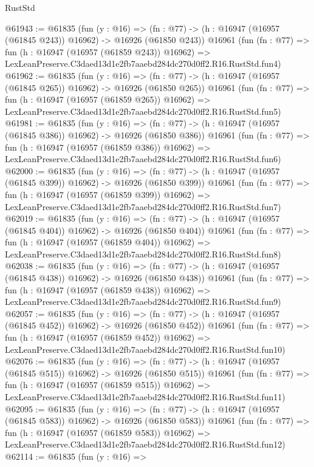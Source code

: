\begin{lexlean}{RustStd}
\begin{coremodule}
@61943 := @61835
    (fun (y : @16) =>
    (fn : @77) -> (h : @16947 (@16957 (@61845 @243)) @16962) -> @16926 (@61850 @243))
    @16961
    (fun (fn : @77) =>
    fun (h : @16947 (@16957 (@61859 @243)) @16962) =>
    LexLeanPreserve.C3daed13d1e2fb7aaebd284dc270d0ff2.R16.RustStd.fun4)
@61962 := @61835
    (fun (y : @16) =>
    (fn : @77) -> (h : @16947 (@16957 (@61845 @265)) @16962) -> @16926 (@61850 @265))
    @16961
    (fun (fn : @77) =>
    fun (h : @16947 (@16957 (@61859 @265)) @16962) =>
    LexLeanPreserve.C3daed13d1e2fb7aaebd284dc270d0ff2.R16.RustStd.fun5)
@61981 := @61835
    (fun (y : @16) =>
    (fn : @77) -> (h : @16947 (@16957 (@61845 @386)) @16962) -> @16926 (@61850 @386))
    @16961
    (fun (fn : @77) =>
    fun (h : @16947 (@16957 (@61859 @386)) @16962) =>
    LexLeanPreserve.C3daed13d1e2fb7aaebd284dc270d0ff2.R16.RustStd.fun6)
@62000 := @61835
    (fun (y : @16) =>
    (fn : @77) -> (h : @16947 (@16957 (@61845 @399)) @16962) -> @16926 (@61850 @399))
    @16961
    (fun (fn : @77) =>
    fun (h : @16947 (@16957 (@61859 @399)) @16962) =>
    LexLeanPreserve.C3daed13d1e2fb7aaebd284dc270d0ff2.R16.RustStd.fun7)
@62019 := @61835
    (fun (y : @16) =>
    (fn : @77) -> (h : @16947 (@16957 (@61845 @404)) @16962) -> @16926 (@61850 @404))
    @16961
    (fun (fn : @77) =>
    fun (h : @16947 (@16957 (@61859 @404)) @16962) =>
    LexLeanPreserve.C3daed13d1e2fb7aaebd284dc270d0ff2.R16.RustStd.fun8)
@62038 := @61835
    (fun (y : @16) =>
    (fn : @77) -> (h : @16947 (@16957 (@61845 @438)) @16962) -> @16926 (@61850 @438))
    @16961
    (fun (fn : @77) =>
    fun (h : @16947 (@16957 (@61859 @438)) @16962) =>
    LexLeanPreserve.C3daed13d1e2fb7aaebd284dc270d0ff2.R16.RustStd.fun9)
@62057 := @61835
    (fun (y : @16) =>
    (fn : @77) -> (h : @16947 (@16957 (@61845 @452)) @16962) -> @16926 (@61850 @452))
    @16961
    (fun (fn : @77) =>
    fun (h : @16947 (@16957 (@61859 @452)) @16962) =>
    LexLeanPreserve.C3daed13d1e2fb7aaebd284dc270d0ff2.R16.RustStd.fun10)
@62076 := @61835
    (fun (y : @16) =>
    (fn : @77) -> (h : @16947 (@16957 (@61845 @515)) @16962) -> @16926 (@61850 @515))
    @16961
    (fun (fn : @77) =>
    fun (h : @16947 (@16957 (@61859 @515)) @16962) =>
    LexLeanPreserve.C3daed13d1e2fb7aaebd284dc270d0ff2.R16.RustStd.fun11)
@62095 := @61835
    (fun (y : @16) =>
    (fn : @77) -> (h : @16947 (@16957 (@61845 @583)) @16962) -> @16926 (@61850 @583))
    @16961
    (fun (fn : @77) =>
    fun (h : @16947 (@16957 (@61859 @583)) @16962) =>
    LexLeanPreserve.C3daed13d1e2fb7aaebd284dc270d0ff2.R16.RustStd.fun12)
@62114 := @61835
    (fun (y : @16) =>

\end{coremodule}
\end{lexlean}

